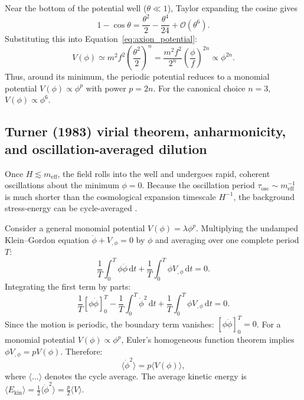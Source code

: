 \documentclass[11pt]{article}
\newcommand{\dd}{\,\mathrm d}
\begin{document}
Near the bottom of the potential well ($\theta \ll 1$), Taylor expanding the cosine gives
\begin{equation}
1 - \cos\theta = \frac{\theta^2}{2} - \frac{\theta^4}{24} + \mathcal O(\theta^6).
\end{equation}
Substituting this into Equation~\eqref{eq:axion_potential}:
\begin{equation}
V(\phi) \simeq m^2f^2 \left( \frac{\theta^2}{2} \right)^n = \frac{m^2f^2}{2^n}\left(\frac{\phi}{f}\right)^{2n} \propto \phi^{2n}.
\end{equation}
Thus, around its minimum, the periodic potential reduces to a monomial potential $V(\phi) \propto \phi^p$ with power $p = 2n$. For the canonical choice $n=3$, $V(\phi) \propto \phi^6$.

\subsection{Turner (1983) virial theorem, anharmonicity, and oscillation-averaged dilution}
Once $H \lesssim m_{\mathrm{eff}}$, the field rolls into the well and undergoes rapid, coherent oscillations about the minimum $\phi = 0$. Because the oscillation period $\tau_{\mathrm{osc}} \sim m_{\mathrm{eff}}^{-1}$ is much shorter than the cosmological expansion timescale $H^{-1}$, the background stress-energy can be cycle-averaged \cite{turner1983scalar}.

Consider a general monomial potential $V(\phi) = \lambda \phi^p$. Multiplying the undamped Klein--Gordon equation $\ddot\phi + V_{,\phi} = 0$ by $\phi$ and averaging over one complete period $T$:
\begin{equation}
\frac{1}{T}\int_0^T \phi\ddot\phi\dd t + \frac{1}{T}\int_0^T \phi V_{,\phi}\dd t = 0.
\end{equation}
Integrating the first term by parts:
\begin{equation}
\frac{1}{T}\left[ \phi\dot\phi \right]_0^T - \frac{1}{T}\int_0^T \dot\phi^2\dd t + \frac{1}{T}\int_0^T \phi V_{,\phi}\dd t = 0.
\end{equation}
Since the motion is periodic, the boundary term vanishes: $\left[\phi\dot\phi\right]_0^T = 0$. For a monomial potential $V(\phi) \propto \phi^p$, Euler's homogeneous function theorem implies $\phi V_{,\phi} = p V(\phi)$. Therefore:
\begin{equation}
\langle \dot\phi^2 \rangle = p \langle V(\phi) \rangle,
\end{equation}
where $\langle \dots \rangle$ denotes the cycle average. The average kinetic energy is $\langle E_{\mathrm{kin}} \rangle = \frac{1}{2}\langle \dot\phi^2 \rangle = \frac{p}{2}\langle V \rangle$.
\end{document}

